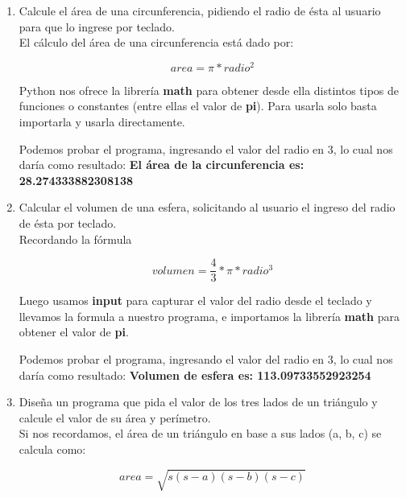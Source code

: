 \begin{enumerate}[{Ejercicio} 1.]
        \item Calcule el área de una circunferencia, pidiendo el radio de ésta al usuario para que lo ingrese por teclado.\\
        
        \asw El cálculo del área de una circunferencia está dado por:

        \[ area = \pi * radio^2 \]

        Python nos ofrece la librería \textbf{math} para obtener desde ella distintos tipos de funciones o constantes (entre ellas el valor de \textbf{pi}). Para usarla solo basta importarla y usarla directamente.\\

        \begin{listing}[H]
        \end{listing}

        Podemos probar el programa, ingresando el valor del radio en 3, lo cual nos daría como resultado: \textbf{El área de la circunferencia es: 28.274333882308138}

        \item Calcular el volumen de una esfera, solicitando al usuario el ingreso del radio de ésta por teclado.\\
        
        \asw Recordando la fórmula

        \[ volumen = \frac{4}{3} * \pi * radio^3 \]

        Luego usamos \textbf{input} para capturar el valor del radio desde el teclado y llevamos la formula a nuestro programa, e importamos la librería \textbf{math} para obtener el valor de \textbf{pi}.\\

        
        Podemos probar el programa, ingresando el valor del radio en 3, lo cual nos daría como resultado: \textbf{Volumen de esfera es: 113.09733552923254}

        \item Diseña un programa que pida el valor de los tres lados de un triángulo y calcule el valor de su área y perímetro. \\
        
        \asw Si nos recordamos, el área de un triángulo en base a sus lados (a, b, c) se calcula como:

        \[ area = \sqrt{s(s-a)(s-b)(s-c)}\]


\end{enumerate}
